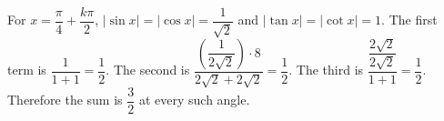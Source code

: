 For $x = \dfrac{\pi}{4} + \dfrac{k \pi}{2}$, $| \sin x | = | \cos x | = \dfrac{1}{\sqrt{2}}$ and $|\tan x|=|\cot x|=1$. The first term is $\dfrac{1}{1+1} = \dfrac{1}{2}$. The second is $\dfrac{(\dfrac{1}{2\sqrt2}) \cdot 8}{2\sqrt2+2\sqrt2} = \dfrac{1}{2}$. The third is $\dfrac{\dfrac{2 \sqrt{2}}{2\sqrt2}}{1+1} = \dfrac{1}{2}$. Therefore the sum is $\boxed{\dfrac{3}{2}}$ at every such angle.
